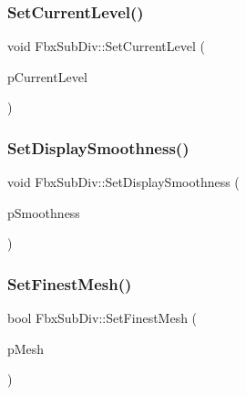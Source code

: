 \mbox{\label{class_fbx_sub_div_a448c996531d5c466ac1b8690fab652a2}} 
\subsubsection{\texorpdfstring{Set\+Current\+Level()}{SetCurrentLevel()}}
{\footnotesize\ttfamily void Fbx\+Sub\+Div\+::\+Set\+Current\+Level (\begin{DoxyParamCaption}\item[{int}]{p\+Current\+Level }\end{DoxyParamCaption})}

\mbox{\label{class_fbx_sub_div_acee4b6e7c777fd8f61778582e176ed1c}} 
\subsubsection{\texorpdfstring{Set\+Display\+Smoothness()}{SetDisplaySmoothness()}}
{\footnotesize\ttfamily void Fbx\+Sub\+Div\+::\+Set\+Display\+Smoothness (\begin{DoxyParamCaption}\item[{\hyperlink{class_fbx_sub_div_a7583b5d09f0eef70bad4563dffbb7e4d}{Fbx\+Sub\+Div\+::\+E\+Display\+Smoothness}}]{p\+Smoothness }\end{DoxyParamCaption})}

\mbox{\label{class_fbx_sub_div_a2205b6c841b523ff9bf80cc473a7aa4e}} 
\subsubsection{\texorpdfstring{Set\+Finest\+Mesh()}{SetFinestMesh()}}
{\footnotesize\ttfamily bool Fbx\+Sub\+Div\+::\+Set\+Finest\+Mesh (\begin{DoxyParamCaption}\item[{\hyperlink{class_fbx_mesh}{Fbx\+Mesh} $\ast$}]{p\+Mesh }\end{DoxyParamCaption})}

